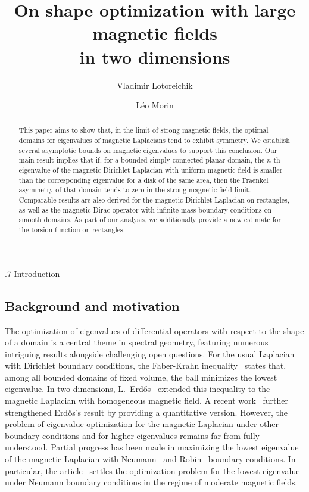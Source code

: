 \documentclass[11pt,a4paper]{amsart}
\title[On shape optimization with large magnetic fields in two dimensions]{On shape optimization with large magnetic fields\\ in two dimensions}
\author[V.~Lotoreichik]{Vladimir Lotoreichik}
\author[L. Morin]{Léo Morin}
\makeatletter
\def\section{\@startsection{section}{1}\z@{.9\linespacing\@plus\linespacing}%
	{.7\linespacing} {\fontsize{13}{14}\selectfont\bfseries\centering}}
\numberwithin{figure}{section}
\numberwithin{equation}{section}
\theoremstyle{plain}%
\theoremstyle{remark}
\theoremstyle{plain}
\makeatother
\begin{document}
\begin{abstract}
This paper aims to show that, in the limit of strong magnetic fields, the optimal domains for eigenvalues of magnetic Laplacians tend to exhibit symmetry.
We establish several asymptotic bounds on magnetic eigenvalues to support this conclusion. Our main result implies that if, for a bounded simply-connected planar domain, the $n$-th eigenvalue of the magnetic Dirichlet Laplacian with uniform magnetic field is smaller than the corresponding eigenvalue for a disk of the same area, then the Fraenkel asymmetry of that domain tends to zero in the strong magnetic field limit. Comparable results are also derived for the magnetic Dirichlet Laplacian on rectangles, as well as the magnetic Dirac operator with infinite mass boundary conditions on smooth domains. As part of our analysis, we additionally provide a new estimate for the torsion function on rectangles.
\end{abstract}	

\maketitle
	
\section{Introduction}	
\subsection{Background and motivation}
The optimization of eigenvalues of differential operators with respect to the shape of a domain is a central theme in spectral geometry, featuring numerous intriguing results alongside challenging open questions. For the usual Laplacian with Dirichlet boundary conditions, the Faber-Krahn inequality~\cite{F23, K,K2} states that, among all bounded domains of fixed volume, the ball minimizes the lowest eigenvalue. In two dimensions, L.~Erd\H{o}s~\cite{Erdos} extended this inequality to the magnetic Laplacian with homogeneous magnetic field. A recent work~\cite{GJM} further strengthened Erd\H{o}s's result by providing a quantitative version. However, the problem of eigenvalue optimization for the magnetic Laplacian under other boundary conditions and for higher eigenvalues remains far from fully understood. Partial progress has been made in maximizing the lowest eigenvalue of the magnetic Laplacian with Neumann~\cite{CLPS24, KL24} and Robin~\cite{KL22} boundary conditions. In particular, the article~\cite{CLPS24} settles the optimization problem for the lowest eigenvalue under Neumann boundary conditions in the regime of moderate magnetic fields.
\end{document}
